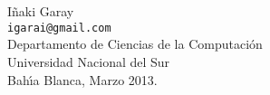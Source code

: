 \chapter*{ }



\null
\vfill

\begin{flushright}
I\~{n}aki Garay \\
{\small \tt igarai@gmail.com} \\
{\sc Departamento de Ciencias de la Computaci\'on \\
Universidad Nacional del Sur } \\
Bah\'{\i}a Blanca, Marzo 2013. \\
\end{flushright}
